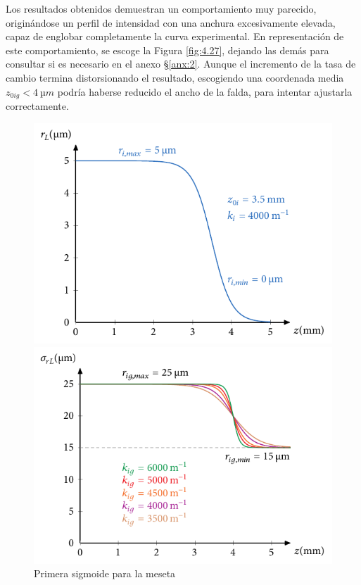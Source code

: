 Los resultados obtenidos demuestran un comportamiento muy parecido, originándose un perfil de intensidad con una anchura excesivamente elevada, capaz de englobar completamente la curva experimental. En representación de este comportamiento, se escoge la Figura \ref{fig:4.27}, dejando las demás para consultar si es necesario en el anexo \S\ref{anx:2}. Aunque el incremento de la tasa de cambio termina distorsionando el resultado, escogiendo una coordenada media $z_{0ig}<\qty{4}{µm}$ podría haberse reducido el ancho de la falda, para intentar ajustarla correctamente.

\begin{figure}[htbp]
  \centering
  \begin{subcaptionblock}{.4\textwidth}
    \centering
    \includegraphics[width=\textwidth]{Figuras/ch4_ejsigm3.pdf}
    \caption{Primera sigmoide para la meseta}\label{fig:ch4_sigm1_rg}
  \end{subcaptionblock}
  \begin{subcaptionblock}{.4\textwidth}
    \centering
    \includegraphics[width=\textwidth]{Figuras/ch4_sigm_kg.pdf}

\end{subcaptionblock}
\end{figure}
